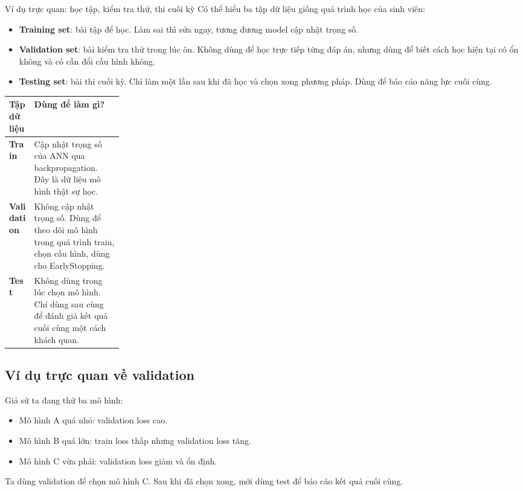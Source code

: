 \documentclass[12pt,a4paper]{article}
\newcommand{\term}[1]{\textbf{#1}}
\begin{document}
\begin{teachbox}{Ví dụ trực quan: học tập, kiểm tra thử, thi cuối kỳ}
Có thể hiểu ba tập dữ liệu giống quá trình học của sinh viên:
\begin{itemize}
    \item \term{Training set}: bài tập để học. Làm sai thì sửa ngay, tương đương model cập nhật trọng số.
    \item \term{Validation set}: bài kiểm tra thử trong lúc ôn. Không dùng để học trực tiếp từng đáp án, nhưng dùng để biết cách học hiện tại có ổn không và có cần đổi cấu hình không.
    \item \term{Testing set}: bài thi cuối kỳ. Chỉ làm một lần sau khi đã học và chọn xong phương pháp. Dùng để báo cáo năng lực cuối cùng.
\end{itemize}
\end{teachbox}

\begin{center}
\begin{tabularx}{0.95\linewidth}{>{\bfseries}p{0.22\linewidth}X}
\toprule
Tập dữ liệu & Dùng để làm gì? \\
\midrule
Train & Cập nhật trọng số của ANN qua backpropagation. Đây là dữ liệu mô hình thật sự học. \\
Validation & Không cập nhật trọng số. Dùng để theo dõi mô hình trong quá trình train, chọn cấu hình, dùng cho EarlyStopping. \\
Test & Không dùng trong lúc chọn mô hình. Chỉ dùng sau cùng để đánh giá kết quả cuối cùng một cách khách quan. \\
\bottomrule
\end{tabularx}
\end{center}

\subsection{Ví dụ trực quan về validation}

Giả sử ta đang thử ba mô hình:

\begin{itemize}
    \item Mô hình A quá nhỏ: validation loss cao.
    \item Mô hình B quá lớn: train loss thấp nhưng validation loss tăng.
    \item Mô hình C vừa phải: validation loss giảm và ổn định.
\end{itemize}

Ta dùng validation để chọn mô hình C. Sau khi đã chọn xong, mới dùng test để báo cáo kết quả cuối cùng.
\end{document}
